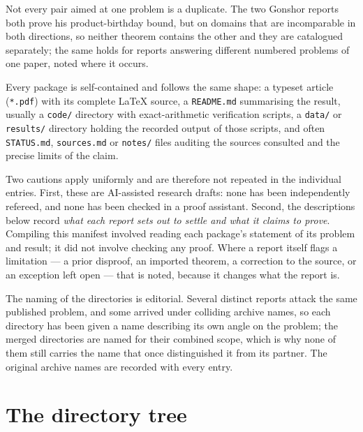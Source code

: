 \documentclass[11pt]{article}
\begin{document}
Not every pair aimed at one problem is a duplicate.  The two Gonshor
reports both prove his product-birthday bound, but on domains that are
incomparable in both directions, so neither theorem contains the other and they
are catalogued separately; the same holds for reports answering different numbered problems of
one paper, noted where it occurs.

Every package is self-contained and follows the same shape: a typeset article
(\texttt{*.pdf}) with its complete \LaTeX{} source, a \texttt{README.md}
summarising the result, usually a \texttt{code/} directory with exact-arithmetic
verification scripts, a \texttt{data/} or \texttt{results/} directory holding the
recorded output of those scripts, and often \texttt{STATUS.md},
\texttt{sources.md} or \texttt{notes/} files auditing the sources consulted and
the precise limits of the claim.

Two cautions apply uniformly and are therefore not repeated in the individual
entries.  First, these are AI-assisted research drafts: none has been
independently refereed, and none has been checked in a proof assistant.  Second,
the descriptions below record \emph{what each report sets out to settle and what
it claims to prove}.  Compiling this manifest involved reading each package's
statement of its problem and result; it did not involve checking any proof.
Where a report itself flags a limitation --- a prior disproof, an imported
theorem, a correction to the source, or an exception left open --- that is noted,
because it changes what the report is.

The naming of the directories is editorial.  Several distinct reports attack the
same published problem, and some arrived under colliding archive names, so each
directory has been given a name describing its own angle on the problem; the
merged directories are named for their combined scope, which is why none of them
still carries the name that once distinguished it from its partner.  The
original archive names are recorded with every entry.

\clearpage
\section{The directory tree}
\label{sec:tree}
\end{document}
